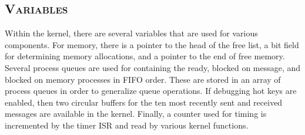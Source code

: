 \documentclass[oneside]{report}
\begin{document}
\begin{table}[H]
    \caption{Kernel Level Data Structures}
    \label{kernel_data_structs}
\end{table}


\subsection{\textsc{Variables}}
Within the kernel, there are several variables that are used for various
components. For memory, there is a pointer to the head of the free list, a bit
field for determining memory allocations, and a pointer to the end of free
memory. Several process queues are used for containing the ready, blocked on
message, and blocked on memory processes in FIFO order. These are stored in an
array of process queues in order to generalize queue operations. If debugging 
hot keys are enabled, then two circular buffers for the ten most recently sent 
and received messages are available in the kernel. Finally, a counter used for
timing is incremented by the timer ISR and read by various kernel functions.
\end{document}
